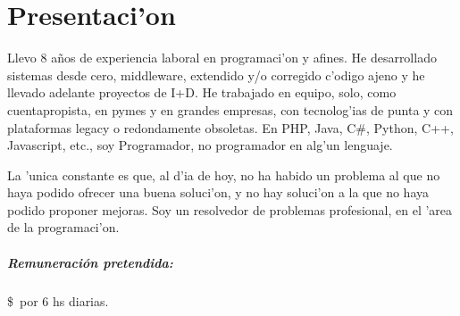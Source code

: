 \documentclass[a4paper,10pt, spanish]{article}
\newcommand\remuneracion{}
\renewcommand\remuneracion{}
\renewcommand\remuneracion{\subparagraph{Remuneraci\'on pretendida:}\$\number\platita\ por 6 hs diarias.}
\begin{document}
\maketitle


\section{Presentaci'on}
Llevo 8 a\~nos de experiencia laboral en programaci'on y afines.  He desarrollado sistemas desde cero, middleware, extendido y/o corregido c'odigo ajeno y he llevado adelante proyectos de I+D.  He trabajado en equipo, solo, como cuentapropista, en pymes y en grandes empresas, con tecnolog'ias de punta y con plataformas legacy o redondamente obsoletas.  En PHP, Java, C\#, Python, C++, Javascript, etc., soy Programador, no programador en alg'un lenguaje.

La 'unica constante es que, al d'ia de hoy, no ha habido un problema al que no haya podido ofrecer una buena soluci'on, y no hay soluci'on a la que no haya podido proponer mejoras.  Soy un resolvedor de problemas profesional, en el 'area de la programaci'on.








%


%




\remuneracion
\end{document}
